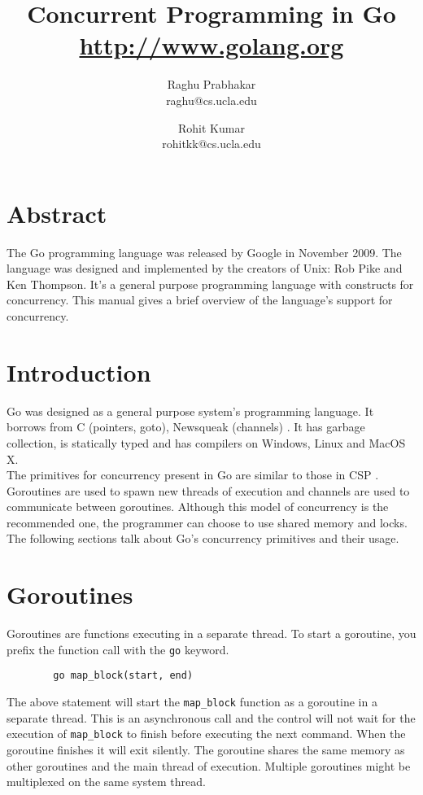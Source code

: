 \documentclass[8pt, twocolumn]{article}
\title{Concurrent Programming in Go \\
\small{\url{http://www.golang.org}}
}
\author{
  Raghu Prabhakar
  \\\small{raghu@cs.ucla.edu}
  \and 
  Rohit Kumar 
  \\\small{rohitkk@cs.ucla.edu}
}
\begin{document}
\maketitle
\section{Abstract}
The Go programming language was released by Google in November
2009. The language was designed and implemented by the creators of
Unix: Rob Pike and Ken Thompson. It's a general purpose programming
language with constructs for concurrency. This manual gives a brief
overview of the language's support for concurrency.\\
\section{Introduction}
Go was designed as a general purpose system's programming language. It
borrows from C (pointers, goto), Newsqueak (channels) \cite{gofaq}. It
has garbage collection, is statically typed and has compilers on
Windows, Linux and MacOS X.\\

The primitives for concurrency present in Go are similar to those
in CSP \cite{goblog}. Goroutines are used to spawn new threads of
execution and channels are used to communicate between
goroutines. Although this model of concurrency is the recommended one,
the programmer can choose to use shared memory and locks. The
following sections talk about Go's concurrency primitives and their
usage.

\section{Goroutines}
Goroutines are functions executing in a separate thread. To start a
goroutine, you prefix the function call with the \verb=go= keyword.
\begin{verbatim}
        go map_block(start, end)
\end{verbatim}
The above statement will start the \verb=map_block= function as a
goroutine in a separate thread. This is an asynchronous call and the
control will not wait for the execution of \verb=map_block= to finish
before executing the next command. When the goroutine finishes it will
exit silently. The goroutine shares the same memory
as other goroutines and the main thread of execution. Multiple
goroutines might be multiplexed on the same system thread.\\
\end{document}
